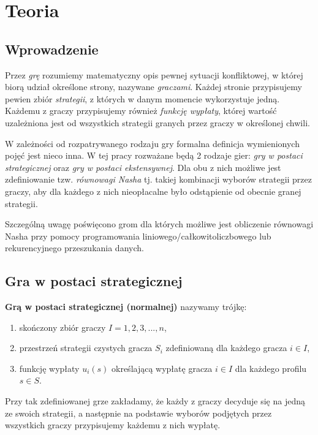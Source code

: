 \documentclass{standalone}
\begin{document}
\pagestyle{headings}

\chapter{Teoria}

\section{Wprowadzenie}

Przez \textit{grę} rozumiemy matematyczny opis pewnej sytuacji konfliktowej, w której biorą udział określone strony,
nazywane \textit{graczami}. Każdej stronie przypisujemy pewien zbiór \textit{strategii}, z których w danym momencie
wykorzystuje jedną. Każdemu z graczy przypisujemy również \textit{funkcję wypłaty}, której wartość uzależniona jest
od wszystkich strategii granych przez graczy w określonej chwili.

W zależności od rozpatrywanego rodzaju gry formalna definicja wymienionych pojęć jest nieco inna. W tej pracy rozważane
będą 2 rodzaje gier: \textit{gry w postaci strategicznej} oraz \textit{gry w postaci ekstensywnej}. Dla obu z nich możliwe
jest zdefiniowanie tzw. \textit{równowagi Nasha} tj. takiej kombinacji wyborów strategii przez graczy, aby dla każdego z nich
nieopłacalne było odstąpienie od obecnie granej strategii.

Szczególną uwagę poświęcono grom dla których możliwe jest obliczenie równowagi Nasha przy pomocy programowania
liniowego/całkowitoliczbowego lub rekurencyjnego przeszukania danych.

\section{Gra w postaci strategicznej}

\begin{definition}
\textbf{Grą w postaci strategicznej (normalnej)} nazywamy trójkę:
\begin{enumerate}
\item skończony zbiór graczy $I = 1, 2, 3, ..., n$,
\item przestrzeń strategii czystych gracza $S_i$ zdefiniowaną dla każdego gracza $i \in I$,
\item funkcję wypłaty $u_i(s)$ określającą wypłatę gracza $i \in I$ dla każdego profilu $s \in S$.
\end{enumerate}
\end{definition}

Przy tak zdefiniowanej grze zakładamy, że każdy z graczy decyduje się na jedną ze swoich strategii, a następnie
na podstawie wyborów podjętych przez wszystkich graczy przypisujemy każdemu z nich wypłatę.
\end{document}
